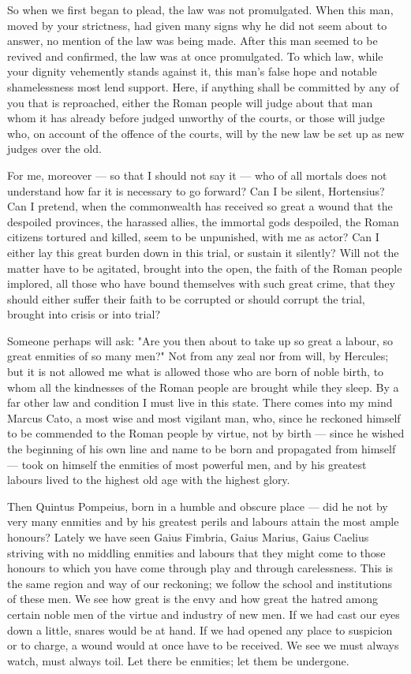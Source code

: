  So when we first began to plead, the law was not promulgated. When this man, moved by your strictness, had given many signs why he did not seem about to answer, no mention of the law was being made. After this man seemed to be revived and confirmed, the law was at once promulgated. To which law, while your dignity vehemently stands against it, this man's false hope and notable shamelessness most lend support. Here, if anything shall be committed by any of you that is reproached, either the Roman people will judge about that man whom it has already before judged unworthy of the courts, or those will judge who, on account of the offence of the courts, will by the new law be set up as new judges over the old.

 For me, moreover --- so that I should not say it --- who of all mortals does not understand how far it is necessary to go forward? Can I be silent, Hortensius? Can I pretend, when the commonwealth has received so great a wound that the despoiled provinces, the harassed allies, the immortal gods despoiled, the Roman citizens tortured and killed, seem to be unpunished, with me as actor? Can I either lay this great burden down in this trial, or sustain it silently? Will not the matter have to be agitated, brought into the open, the faith of the Roman people implored, all those who have bound themselves with such great crime, that they should either suffer their faith to be corrupted or should corrupt the trial, brought into crisis or into trial?

 Someone perhaps will ask: "Are you then about to take up so great a labour, so great enmities of so many men?" Not from any zeal nor from will, by Hercules; but it is not allowed me what is allowed those who are born of noble birth, to whom all the kindnesses of the Roman people are brought while they sleep. By a far other law and condition I must live in this state. There comes into my mind Marcus Cato, a most wise and most vigilant man, who, since he reckoned himself to be commended to the Roman people by virtue, not by birth --- since he wished the beginning of his own line and name to be born and propagated from himself --- took on himself the enmities of most powerful men, and by his greatest labours lived to the highest old age with the highest glory.

 Then Quintus Pompeius, born in a humble and obscure place --- did he not by very many enmities and by his greatest perils and labours attain the most ample honours? Lately we have seen Gaius Fimbria, Gaius Marius, Gaius Caelius striving with no middling enmities and labours that they might come to those honours to which you have come through play and through carelessness. This is the same region and way of our reckoning; we follow the school and institutions of these men. We see how great is the envy and how great the hatred among certain noble men of the virtue and industry of new men. If we had cast our eyes down a little, snares would be at hand. If we had opened any place to suspicion or to charge, a wound would at once have to be received. We see we must always watch, must always toil. Let there be enmities; let them be undergone.

